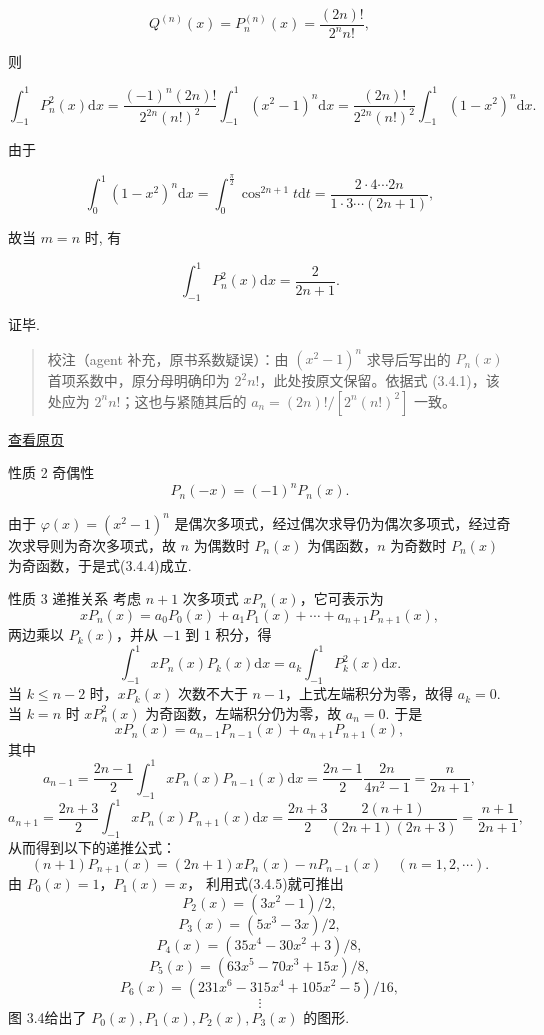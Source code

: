 \documentclass[
  10pt,
  fontset=fandol]{ctexart}
\begin{document}
\[
Q^{(n)}(x) = P_n^{(n)}(x) = \frac{(2n)!}{2^n n!},
\]

则

\[
\int_{-1}^{1} P_n^2(x) \mathrm{d}x = \frac{(-1)^n (2n)!}{2^{2n} (n!)^2} \int_{-1}^{1} (x^2 - 1)^n \mathrm{d}x = \frac{(2n)!}{2^{2n} (n!)^2} \int_{-1}^{1} (1 - x^2)^n \mathrm{d}x.
\]

由于

\[
\int_{0}^{1} (1 - x^2)^n \mathrm{d}x = \int_{0}^{\frac{\pi}{2}} \cos^{2n+1} t \mathrm{d}t = \frac{2 \cdot 4 \cdots 2n}{1 \cdot 3 \cdots (2n+1)},
\]

故当 \(m = n\) 时, 有

\[
\int_{-1}^{1} P_n^2(x) \mathrm{d}x = \frac{2}{2n+1}.
\]

证毕.

\begin{quote}
校注（agent 补充，原书系数疑误）：由 \((x^2-1)^n\) 求导后写出的 \(P_n(x)\) 首项系数中，原分母明确印为 \(2^2n!\)，此处按原文保留。依据式 (3.4.1)，该处应为 \(2^nn!\)；这也与紧随其后的 \(a_n=(2n)!/[2^n(n!)^2]\) 一致。
\end{quote}

\href{../../source-images/pdf-072.jpeg}{查看原页}

性质 2 奇偶性 \[
P_n(-x) = (-1)^n P_n(x). \tag{3.4.4}
\]

由于 \(\varphi(x) = (x^2 - 1)^n\) 是偶次多项式，经过偶次求导仍为偶次多项式，经过奇次求导则为奇次多项式，故 \(n\) 为偶数时 \(P_n(x)\) 为偶函数，\(n\) 为奇数时 \(P_n(x)\) 为奇函数，于是式(3.4.4)成立.

性质 3 递推关系 考虑 \(n+1\) 次多项式 \(xP_n(x)\)，它可表示为 \[
xP_n(x) = a_0P_0(x) + a_1P_1(x) + \cdots + a_{n+1}P_{n+1}(x),
\] 两边乘以 \(P_k(x)\)，并从 \(-1\) 到 \(1\) 积分，得 \[
\int_{-1}^{1} xP_n(x)P_k(x) \mathrm{d}x = a_k \int_{-1}^{1} P_k^2(x) \mathrm{d}x.
\] 当 \(k \leqslant n-2\) 时，\(xP_k(x)\) 次数不大于 \(n-1\)，上式左端积分为零，故得 \(a_k = 0\). 当 \(k=n\) 时 \(xP_n^2(x)\) 为奇函数，左端积分仍为零，故 \(a_n = 0\). 于是 \[
xP_n(x) = a_{n-1}P_{n-1}(x) + a_{n+1}P_{n+1}(x),
\] 其中 \[
a_{n-1} = \frac{2n-1}{2} \int_{-1}^{1} xP_n(x)P_{n-1}(x) \mathrm{d}x = \frac{2n-1}{2} \frac{2n}{4n^2-1} = \frac{n}{2n+1},
\] \[
a_{n+1} = \frac{2n+3}{2} \int_{-1}^{1} xP_n(x)P_{n+1}(x) \mathrm{d}x = \frac{2n+3}{2} \frac{2(n+1)}{(2n+1)(2n+3)} = \frac{n+1}{2n+1},
\] 从而得到以下的递推公式： \[
(n+1)P_{n+1}(x) = (2n+1)xP_n(x) - nP_{n-1}(x) \quad (n=1,2,\cdots). \tag{3.4.5}
\] 由 \(P_0(x)=1\)，\(P_1(x)=x\)， 利用式(3.4.5)就可推出 \[
P_2(x) = (3x^2 - 1)/2,
\] \[
P_3(x) = (5x^3 - 3x)/2,
\] \[
P_4(x) = (35x^4 - 30x^2 + 3)/8,
\] \[
P_5(x) = (63x^5 - 70x^3 + 15x)/8,
\] \[
P_6(x) = (231x^6 - 315x^4 + 105x^2 - 5)/16,
\] \[
\vdots
\] 图 3.4给出了 \(P_0(x), P_1(x), P_2(x), P_3(x)\) 的图形.
\end{document}
